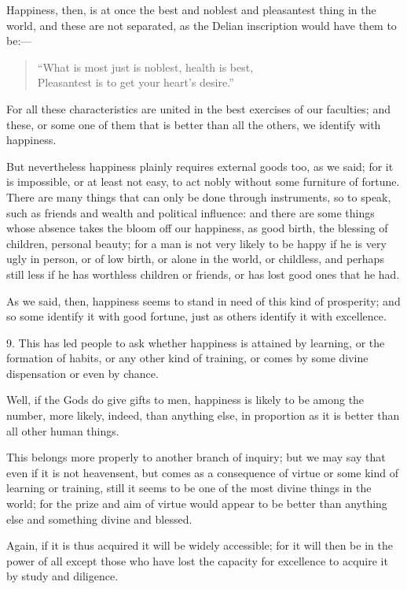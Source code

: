 Happiness, then, is at once the best and noblest and pleasantest thing
in the world, and these are not separated, as the Delian inscription
would have them to be:---

\begin{verse}
``What is most just is noblest, health is best,\\
Pleasantest is to get your heart's desire.''
\end{verse}

\noindent For all these characteristics are united in the best
exercises of our faculties; and these, or some one of them that is
better than all the others, we identify with happiness.

But nevertheless happiness plainly requires external goods too, as we
said; for it is impossible, or at least not easy, to act nobly without
some furniture of fortune. There are many things that can only be done
through instruments, so to speak, such as friends and wealth and
political influence: and there are some things whose absence takes the
bloom off our happiness, as good birth, the blessing of children,
personal beauty; for a man is not very likely to be happy if he is
very ugly in person, or of low birth, or alone in the world, or
childless, and perhaps still less if he has worthless children or
friends, or has lost good ones that he had.

As we said, then, happiness seems to stand in need of this kind of
prosperity; and so some identify it  with good fortune, just
as others identify it with excellence.

9. This has led people to ask whether happiness is attained by
learning, or the formation of habits, or any other kind of training,
or comes by some divine dispensation or even by chance.

Well, if the Gods do give gifts to men, happiness is likely to be
among the number, more likely, indeed, than anything else, in
proportion as it is better than all other human things.

This belongs more properly to another branch of inquiry; but we may
say that even if it is not heavensent, but comes as a consequence of
virtue or some kind of learning or training, still it seems to be one
of the most divine things in the world; for the prize and aim of
virtue would appear to be better than anything else and something
divine and blessed.

Again, if it is thus acquired it will be widely accessible; for it
will then be in the power of all except those who have lost the
capacity for excellence to acquire it by study and diligence.

